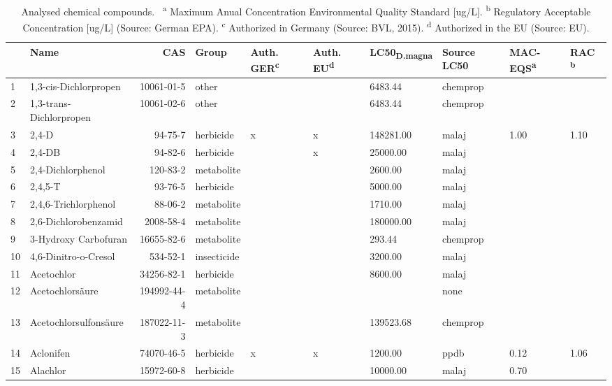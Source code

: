 \begingroup\fontsize{8pt}{10pt}\selectfont
\begin{longtable}{lp{3cm}rlp{0.5cm}p{0.5cm}p{1cm}p{1cm}p{1cm}p{1cm}}
\caption{Analysed chemical compounds. \
                    \textsuperscript{a} Maximum Anual Concentration Environmental Quality Standard [ug/L].
                    \textsuperscript{b} Regulatory Acceptable Concentration [ug/L] (Source: German EPA).
                    \textsuperscript{c} Authorized in Germany (Source: BVL, 2015). 
                    \textsuperscript{d} Authorized in the EU (Source: EU).} \\ 
  \toprule
 & Name & CAS & Group & Auth. GER\textsuperscript{c} & Auth. EU\textsuperscript{d} & LC50\textsubscript{D.magna} & Source LC50 & MAC-EQS\textsuperscript{a} & RAC \textsuperscript{b} \\ 
  \midrule
1 & 1,3-cis-Dichlorpropen & 10061-01-5 & other &  &  & 6483.44 & chemprop &  &  \\ 
  2 & 1,3-trans-Dichlorpropen & 10061-02-6 & other &  &  & 6483.44 & chemprop &  &  \\ 
  3 & 2,4-D & 94-75-7 & herbicide & x & x & 148281.00 & malaj & 1.00 & 1.10 \\ 
  4 & 2,4-DB & 94-82-6 & herbicide &  & x & 25000.00 & malaj &  &  \\ 
  5 & 2,4-Dichlorphenol & 120-83-2 & metabolite &  &  & 2600.00 & malaj &  &  \\ 
  6 & 2,4,5-T & 93-76-5 & herbicide &  &  & 5000.00 & malaj &  &  \\ 
  7 & 2,4,6-Trichlorphenol & 88-06-2 & metabolite &  &  & 1710.00 & malaj &  &  \\ 
  8 & 2,6-Dichlorobenzamid & 2008-58-4 & metabolite &  &  & 180000.00 & malaj &  &  \\ 
  9 & 3-Hydroxy Carbofuran & 16655-82-6 & metabolite &  &  & 293.44 & chemprop &  &  \\ 
  10 & 4,6-Dinitro-o-Cresol & 534-52-1 & insecticide &  &  & 3200.00 & malaj &  &  \\ 
  11 & Acetochlor & 34256-82-1 & herbicide &  &  & 8600.00 & malaj &  &  \\ 
  12 & Acetochlorsäure & 194992-44-4 & metabolite &  &  &  & none &  &  \\ 
  13 & Acetochlorsulfonsäure & 187022-11-3 & metabolite &  &  & 139523.68 & chemprop &  &  \\ 
  14 & Aclonifen & 74070-46-5 & herbicide & x & x & 1200.00 & ppdb & 0.12 & 1.06 \\ 
  15 & Alachlor & 15972-60-8 & herbicide &  &  & 10000.00 & malaj & 0.70 &  \\ 

\end{longtable}
